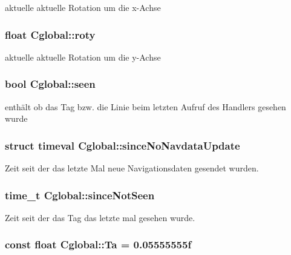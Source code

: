 aktuelle aktuelle Rotation um die x-\/Achse 

\hypertarget{class_cglobal_a5c1fac565d3813e798bd6aeb1c6fc8aa}{
\subsubsection[{roty}]{\setlength{\rightskip}{0pt plus 5cm}float {\bf Cglobal::roty}}}
\label{class_cglobal_a5c1fac565d3813e798bd6aeb1c6fc8aa}


aktuelle aktuelle Rotation um die y-\/Achse 

\hypertarget{class_cglobal_afe6f01a7ff64a3de6d0c8612f36511fd}{
\subsubsection[{seen}]{\setlength{\rightskip}{0pt plus 5cm}bool {\bf Cglobal::seen}}}
\label{class_cglobal_afe6f01a7ff64a3de6d0c8612f36511fd}


enthält ob das Tag bzw. die Linie beim letzten Aufruf des Handlers gesehen wurde 

\hypertarget{class_cglobal_a9a9df79aad0bb5db8880a83d2fb407e2}{
\subsubsection[{sinceNoNavdataUpdate}]{\setlength{\rightskip}{0pt plus 5cm}struct timeval {\bf Cglobal::sinceNoNavdataUpdate}}}
\label{class_cglobal_a9a9df79aad0bb5db8880a83d2fb407e2}


Zeit seit der das letzte Mal neue Navigationsdaten gesendet wurden. 

\hypertarget{class_cglobal_abb1e0f2a241a8d9131098cf823b45f64}{
\subsubsection[{sinceNotSeen}]{\setlength{\rightskip}{0pt plus 5cm}time\_\-t {\bf Cglobal::sinceNotSeen}}}
\label{class_cglobal_abb1e0f2a241a8d9131098cf823b45f64}


Zeit seit der das Tag das letzte mal gesehen wurde. 

\hypertarget{class_cglobal_a7a599bd2c2f4400e3b7f8f98e1f293fe}{
\subsubsection[{Ta}]{\setlength{\rightskip}{0pt plus 5cm}const float {\bf Cglobal::Ta} = 0.05555555f}}
\label{class_cglobal_a7a599bd2c2f4400e3b7f8f98e1f293fe}


